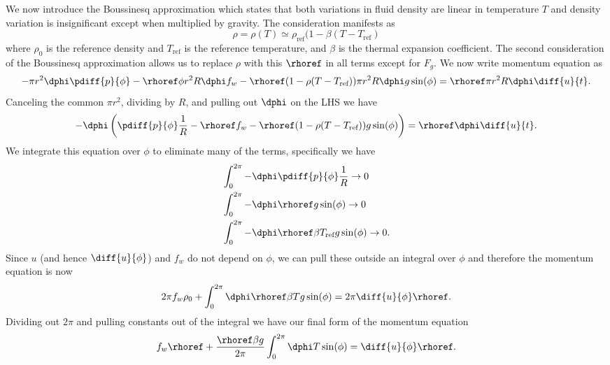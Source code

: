 We now introduce the Boussinesq approximation which states that both variations in fluid density are linear in temperature $T$ and density variation is insignificant except when multiplied by gravity.
The consideration manifests as
\begin{equation*} \rho = \rho (T) \simeq \rho _\text{ref} (1 - \beta (T - T_\text{ref}) \end{equation*}
where $\rho _0$ is the reference density and $T_\text{ref}$ is the reference temperature, and $\beta$ is the thermal expansion coefficient.
The second consideration of the Boussinesq approximation allows us to replace $\rho$ with this $\rhoref$ in all terms except for $F_g$.
We now write momentum equation as
\begin{equation} -\pi r^2 \dphi \pdiff{p}{\phi} - \rhoref \phi r^2 R \dphi f_w
- \rhoref (1 - \rho (T- T_\text{ref}) ) \pi r^2 R \dphi g \sin (\phi) = \rhoref \pi r^2 R \dphi \diff{u}{t}. \end{equation}
Canceling the common $\pi r^2$, dividing by $R$, and pulling out $\dphi$ on the LHS we have
\begin{equation} -\dphi \left ( \pdiff{p}{\phi}  \frac{1}{R} - \rhoref f_w - \rhoref (1 - \rho (T- T_\text{ref}) ) g \sin (\phi) \right ) = \rhoref \dphi \diff{u}{t}. \label{eq:EM07} \end{equation}
We integrate this equation over $\phi$ to eliminate many of the terms, specifically we have
\begin{align*}
& \int _{0} ^{2\pi} -\dphi \pdiff{p}{\phi} \frac{1}{R} \rightarrow 0\\
& \int _{0} ^{2\pi} -\dphi \rhoref g \sin (\phi) \rightarrow 0\\
& \int _{0} ^{2\pi} -\dphi \rhoref \beta T_\text{ref} g \sin (\phi) \rightarrow 0.\end{align*}
Since $u$ (and hence $\diff{u}{\phi}$) and $f_w$ do not depend on $\phi$, we can pull these outside an integral over $\phi$ and therefore the momentum equation is now 
\begin{equation*} 2\pi f_w \rho _0 + \int _{0} ^{2\pi} \dphi \rhoref \beta T g \sin (\phi) = 2\pi \diff{u}{\phi} \rhoref .\end{equation*}
Dividing out $2\pi$ and pulling constants out of the integral we have our final form of the momentum equation
\begin{equation} f_w \rhoref + \frac{\rhoref \beta g }{2 \pi} \int _{0} ^{2\pi} \dphi T \sin (\phi) = \diff{u}{\phi} \rhoref \label{eq:EM10}.\end{equation}
